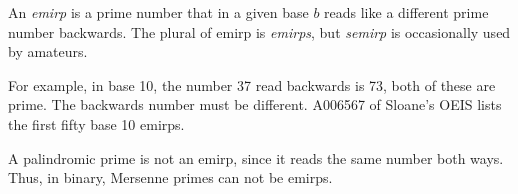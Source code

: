 \documentclass[12pt]{article}
\begin{document}
An {\em emirp} is a prime number that in a given base $b$ reads like a different prime number backwards. The plural of emirp is {\em emirps}, but {\em semirp} is occasionally used by amateurs.

For example, in base 10, the number 37 read backwards is 73, both of these are prime. The backwards number must be different. A006567 of Sloane's OEIS lists the first fifty base 10 emirps.

A palindromic prime is not an emirp, since it reads the same number both ways. Thus, in binary, Mersenne primes can not be emirps.
\end{document}
